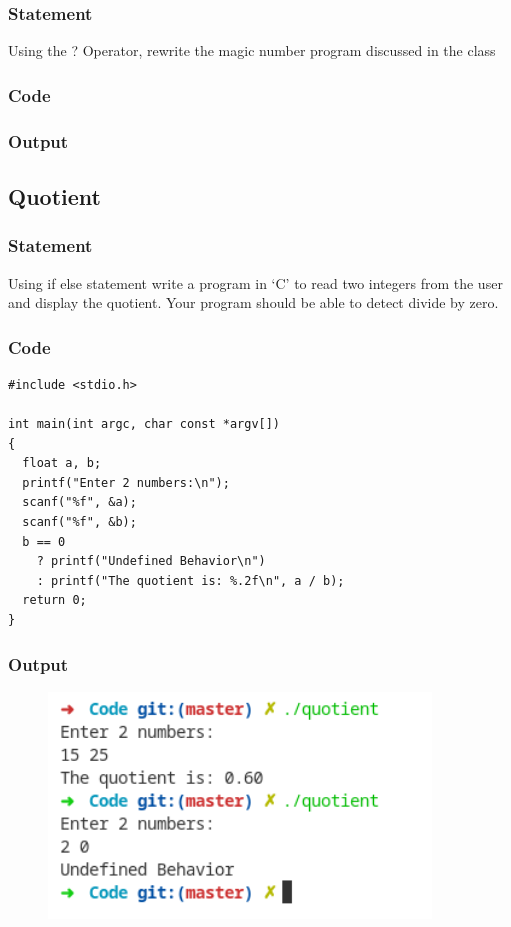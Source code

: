 \subsubsection{Statement}
Using the ? Operator, rewrite the magic number program discussed in the class

\subsubsection{Code}

\subsubsection{Output}

\pagebreak
\subsection{Quotient}
\subsubsection{Statement}
Using if else statement write a program in ‘C’ to read two integers from the user and display
the quotient. Your program should be able to detect divide by zero.
\subsubsection{Code}
\begin{verbatim} 
#include <stdio.h>

int main(int argc, char const *argv[])
{
  float a, b;
  printf("Enter 2 numbers:\n");
  scanf("%f", &a);
  scanf("%f", &b);
  b == 0 
    ? printf("Undefined Behavior\n") 
    : printf("The quotient is: %.2f\n", a / b);
  return 0;
}

\end{verbatim}
\subsubsection{Output}
\begin{figure}[!htb]
  \centering
  \includegraphics[width=4in]{Images/quotient.png}
  \label{output:9}
\end{figure}


